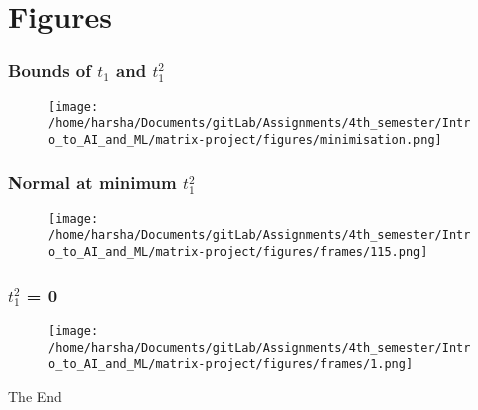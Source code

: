 \documentclass[12pt]{beamer}
\begin{document}
\section{Figures}

\begin{frame}
\frametitle{Bounds of $t_1$ and $t_1^2$}
\begin{figure}
\centering
\texttt{[image: /home/harsha/Documents/gitLab/Assignments/4th\_semester/Intro\_to\_AI\_and\_ML/matrix-project/figures/minimisation.png]}
\label{Bounds of $t_1$ and $t_1^2$}
\end{figure}
\end{frame}


\begin{frame}
\frametitle{Normal at minimum $t_1^2$}
\begin{figure}
\centering
\texttt{[image: /home/harsha/Documents/gitLab/Assignments/4th\_semester/Intro\_to\_AI\_and\_ML/matrix-project/figures/frames/115.png]}
\label{Normal at minimum $t_1^2$}
\end{figure}
\end{frame}


\begin{frame}
\frametitle{$t_1^2$ = 0}
\begin{figure}
\centering
\texttt{[image: /home/harsha/Documents/gitLab/Assignments/4th\_semester/Intro\_to\_AI\_and\_ML/matrix-project/figures/frames/1.png]}
\label{$t_1^2 = 0$}
\end{figure}
\end{frame}


\begin{frame}
\Huge{\centerline{The End}}
\end{frame}

\end{document}
